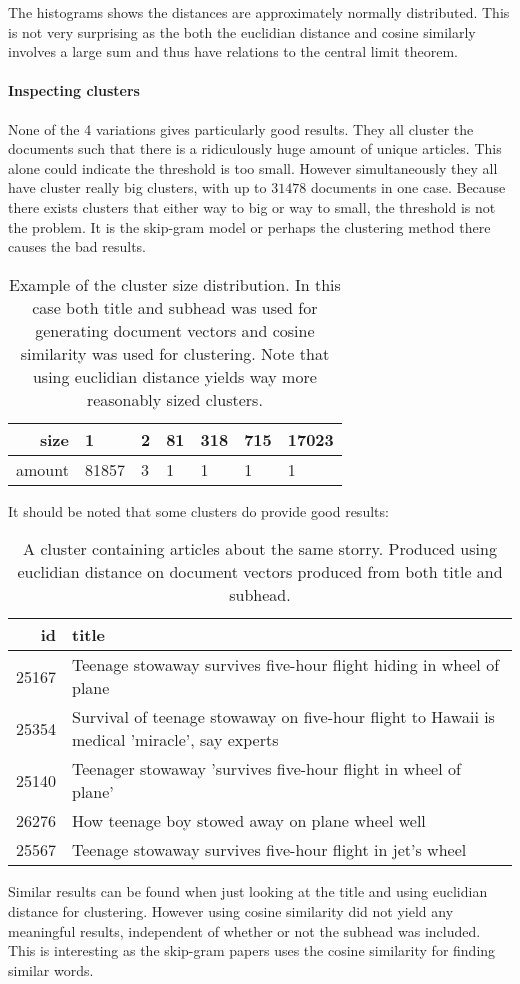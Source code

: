 The histograms shows the distances are approximately normally distributed. This is not very surprising as the both the euclidian distance and cosine similarly involves a large sum and thus have relations to the central limit theorem.

\paragraph{Inspecting clusters}  None of the 4 variations gives particularly good results. They all cluster the documents such that there is a ridiculously huge amount of unique articles. This alone could indicate the threshold is too small. However simultaneously they all have cluster really big clusters, with up to $31478$ documents in one case. Because there exists clusters that either way to big or way to small, the threshold is not the problem. It is the skip-gram model or perhaps the clustering method there causes the bad results.

\begin{table}[H]
\centering
\begin{tabular}{r|l l l l l l }
size & 1 & 2 & 81 & 318 & 715 & 17023 \\ \hline
amount & 81857 & 3 & 1 & 1 & 1 & 1
\end{tabular}
\caption{Example of the cluster size distribution. In this case both title and subhead was used for generating document vectors and cosine similarity was used for clustering. Note that using euclidian distance yields way more reasonably sized clusters.}
\end{table}

It should be noted that some clusters do provide good results:

\begin{table}[H]
\centering
\begin{tabular}{r|p{10cm}}
id & title \\ \hline
 25167 & Teenage stowaway survives five-hour flight hiding in wheel of plane \\
 25354 & Survival of teenage stowaway on five-hour flight to Hawaii is medical 'miracle', say experts \\
 25140 & Teenager stowaway 'survives five-hour flight in wheel of plane' \\
 26276 & How teenage boy stowed away on plane wheel well \\
 25567 & Teenage stowaway survives five-hour flight in jet's wheel
\end{tabular}
\caption{A cluster containing articles about the same storry. Produced using euclidian distance on document vectors produced from both title and subhead.}
\end{table}
 
Similar results can be found when just looking at the title and using euclidian distance for clustering. However using cosine similarity did not yield any meaningful results, independent of whether or not the subhead was included. This is interesting as the skip-gram papers \cite{word2vec-comparing, word2vec-details} uses the cosine similarity for finding similar words. 

